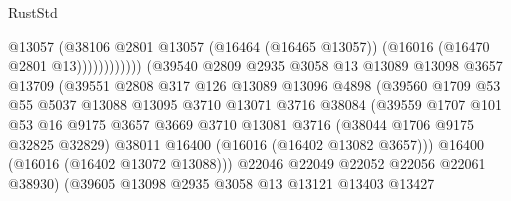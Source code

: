 \begin{lexlean}{RustStd}
\begin{coremodule}
                                            @13057
                                            (@38106
                                              @2801
                                              @13057
                                              (@16464 (@16465 @13057))
                                              (@16016 (@16470 @2801 @13))))))))))))
                          (@39540
                            @2809
                            @2935
                            @3058
                            @13
                            @13089
                            @13098
                            @3657
                            @13709
                            (@39551
                              @2808
                              @317
                              @126
                              @13089
                              @13096
                              @4898
                              (@39560
                                @1709
                                @53
                                @55
                                @5037
                                @13088
                                @13095
                                @3710
                                @13071
                                @3716
                                @38084
                                (@39559
                                  @1707
                                  @101
                                  @53
                                  @16
                                  @9175
                                  @3657
                                  @3669
                                  @3710
                                  @13081
                                  @3716
                                  (@38044 @1706 @9175 @32825 @32829)
                                  @38011
                                  @16400
                                  (@16016 (@16402 @13082 @3657)))
                                @16400
                                (@16016 (@16402 @13072 @13088)))
                              @22046
                              @22049
                              @22052
                              @22056
                              @22061
                              @38930)
                            (@39605
                              @13098
                              @2935
                              @3058
                              @13
                              @13121
                              @13403
                              @13427

\end{coremodule}
\end{lexlean}
